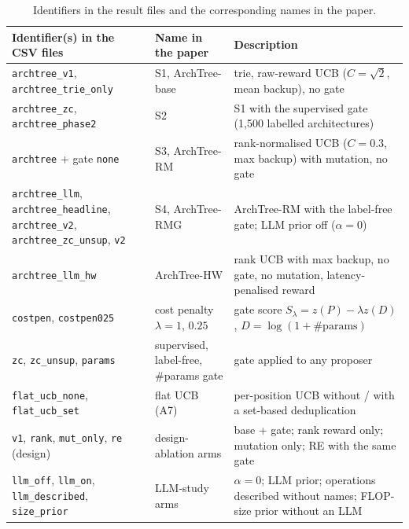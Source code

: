 \documentclass{sadhana}
\newcommand{\algname}{ArchTree}
\newcommand{\rmg}{ArchTree-RMG}
\begin{document}
\begin{table}[tbp]
\caption{Identifiers in the result files and the corresponding names in the paper.}\label{t:names}
\centering\footnotesize
\begin{tabular}{@{}>{\raggedright\arraybackslash}p{}>{\raggedright\arraybackslash}p{}>{\raggedright\arraybackslash}p{}@{}}
\toprule
Identifier(s) in the CSV files & Name in the paper & Description\\
\midrule
\texttt{archtree\_v1}, \texttt{archtree\_trie\_only} & S1, \algname-base & trie, raw-reward UCB ($C=\sqrt2$, mean backup), no gate\\
\texttt{archtree\_zc}, \texttt{archtree\_phase2} & S2 & S1 with the supervised gate (1,500 labelled architectures)\\
\texttt{archtree} + gate \texttt{none} & S3, \algname-RM & rank-normalised UCB ($C=0.3$, max backup) with mutation, no gate\\
\texttt{archtree\_llm}, \texttt{archtree\_headline}, \texttt{archtree\_v2}, \texttt{archtree\_zc\_unsup}, \texttt{v2} & S4, \rmg & \algname-RM with the label-free gate; LLM prior off ($\alpha=0$)\\
\texttt{archtree\_llm\_hw} & \algname-HW & rank UCB with max backup, no gate, no mutation, latency-penalised reward\\
\texttt{costpen}, \texttt{costpen025} & cost penalty $\lambda=1$, $0.25$ & gate score $S_\lambda=z(P)-\lambda z(D)$, $D=\log(1+\#\text{params})$\\
\texttt{zc}, \texttt{zc\_unsup}, \texttt{params} & supervised, label-free, \#params gate & gate applied to any proposer\\
\texttt{flat\_ucb\_none}, \texttt{flat\_ucb\_set} & flat UCB (A7) & per-position UCB without / with a set-based deduplication\\
\texttt{v1}, \texttt{rank}, \texttt{mut\_only}, \texttt{re} (design) & design-ablation arms & base + gate; rank reward only; mutation only; RE with the same gate\\
\texttt{llm\_off}, \texttt{llm\_on}, \texttt{llm\_described}, \texttt{size\_prior} & LLM-study arms & $\alpha=0$; LLM prior; operations described without names; FLOP-size prior without an LLM\\
\bottomrule
\end{tabular}
\end{table}
\end{document}
